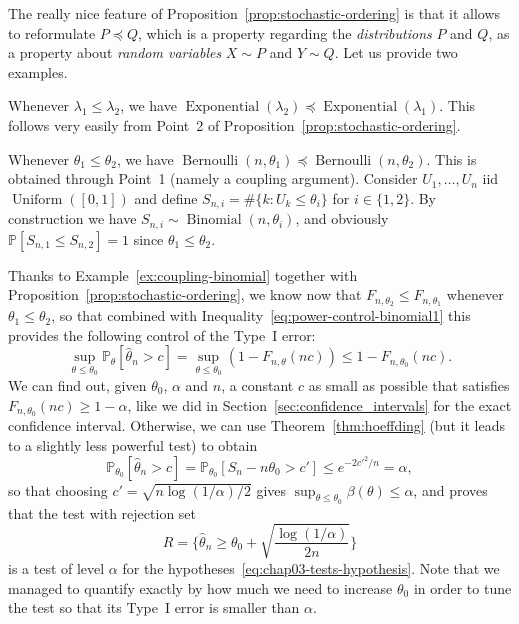 \documentclass[
	fontsize=11pt, %
	twoside=false, %
	numbers=noenddot, %
]{kaobook}
\DeclareMathOperator{\ber}{Bernoulli}
\DeclareMathOperator{\bin}{Binomial}
\DeclareMathOperator{\expo}{Exponential}
\DeclareMathOperator{\uni}{Uniform}
\renewcommand{\P}{\mathbb P}
\newcommand{\wh}{\widehat}
\newcommand{\lest}{\preceq}
\begin{document}
The really nice feature of Proposition~\ref{prop:stochastic-ordering} is that it allows to reformulate $P \lest Q$, which is a property regarding the \emph{distributions} $P$ and $Q$, as a property about \emph{random variables} $X \sim P$ and $Y \sim Q$.
Let us provide two examples.
\begin{example}
	Whenever $\lambda_1 \leq \lambda_2$, we have $\expo(\lambda_2) \lest \expo(\lambda_1)$. This follows very easily from Point~2 of Proposition~\ref{prop:stochastic-ordering}.
\end{example}
\begin{example}
	\label{ex:coupling-binomial}
	Whenever $\theta_1 \leq \theta_2$, we have $\ber(n, \theta_1) \lest \ber(n, \theta_2)$. This is obtained through Point~1 (namely a coupling argument).
	Consider $U_1, \ldots, U_n$ iid $\uni([0, 1])$ and define $S_{n, i} = \# \{ k : U_k \leq \theta_i \}$ for $i \in \{ 1, 2 \}$. By construction we have $S_{n, i} \sim \bin(n, \theta_i)$, and obviously $\P[S_{n, 1} \leq S_{n, 2}] = 1$ since $\theta_1 \leq \theta_2$.
\end{example}
Thanks to Example~\ref{ex:coupling-binomial} together with Proposition~\ref{prop:stochastic-ordering}, we know now that $F_{n, \theta_2} \leq F_{n, \theta_1}$ whenever $\theta_1 \leq \theta_2$, so that combined with Inequality~\eqref{eq:power-control-binomial1} this provides the following control of the Type~I error:
\begin{equation*}
	\sup_{\theta \leq \theta_0} \P_\theta[ \wh \theta_n > c] = \sup_{\theta \leq \theta_0} (1 - F_{n, \theta}(n c)) \leq 1 - F_{n, \theta_0}(n c).
\end{equation*}
We can find out, given $\theta_0$, $\alpha$ and $n$, a constant $c$ as small as possible that satisfies $F_{n, \theta_0}(n c) \geq 1 - \alpha$, like we did in Section~\ref{sec:confidence_intervals} for the exact confidence interval.
Otherwise, we can use Theorem~\ref{thm:hoeffding} (but it leads to a slightly less powerful test) to obtain
\begin{equation*}
	\P_{\theta_0} [\wh \theta_n > c] = \P_{\theta_0}[S_n - n \theta_0 > c'] \leq e^{-2 c'^2 / n} = \alpha,
\end{equation*}
so that choosing $c' = \sqrt{n \log(1 / \alpha) / 2}$ gives $\sup_{\theta \leq \theta_0} \beta(\theta) \leq \alpha$, and proves that the test with rejection set 
\begin{equation*}
	R = \bigg\{ \wh \theta_n \geq \theta_0 + \sqrt{ \frac{\log(1 / \alpha)}{2n}} \bigg\}
\end{equation*}
is a test of level $\alpha$ for the hypotheses~\eqref{eq:chap03-tests-hypothesis}.
Note that we managed to quantify exactly by how much we need to increase $\theta_0$ in order to tune the test so that its Type~I error is smaller than $\alpha$.
\end{document}
